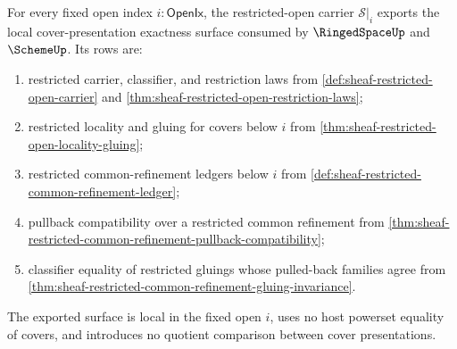 \begin{theorem}
\label{thm:sheaf-restricted-open-refinement-exactness-export}
For every fixed open index $i:\mathsf{OpenIx}$, the restricted-open carrier $\mathcal{S}|_i$ exports the local cover-presentation exactness surface consumed by $\RingedSpaceUp$ and $\SchemeUp$. Its rows are:
\begin{enumerate}
\item restricted carrier, classifier, and restriction laws from \autoref{def:sheaf-restricted-open-carrier} and \autoref{thm:sheaf-restricted-open-restriction-laws};
\item restricted locality and gluing for covers below $i$ from \autoref{thm:sheaf-restricted-open-locality-gluing};
\item restricted common-refinement ledgers below $i$ from \autoref{def:sheaf-restricted-common-refinement-ledger};
\item pullback compatibility over a restricted common refinement from \autoref{thm:sheaf-restricted-common-refinement-pullback-compatibility};
\item classifier equality of restricted gluings whose pulled-back families agree from \autoref{thm:sheaf-restricted-common-refinement-gluing-invariance}.
\end{enumerate}
The exported surface is local in the fixed open $i$, uses no host powerset equality of covers, and introduces no quotient comparison between cover presentations.
\end{theorem}
